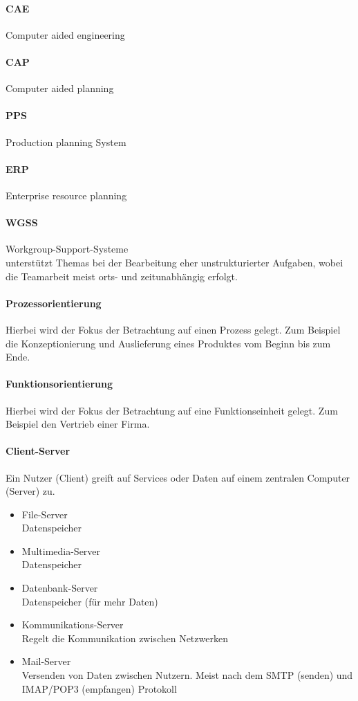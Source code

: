 \documentclass[twocolumn]{article}
\begin{document}
\paragraph{CAE}
	Computer aided engineering

\paragraph{CAP}
	Computer aided planning

\paragraph{PPS}
	Production planning System

\paragraph{ERP}
	Enterprise resource planning

\paragraph{WGSS}
	 Workgroup-Support-Systeme \\
	 unterstützt Themas bei der Bearbeitung eher unstrukturierter Aufgaben, wobei die Teamarbeit meist orts- und zeitunabhängig erfolgt.

\paragraph{Prozessorientierung}
	Hierbei wird der Fokus der Betrachtung auf einen Prozess gelegt. Zum Beispiel die Konzeptionierung und Auslieferung eines Produktes vom Beginn bis zum Ende. 

\paragraph{Funktionsorientierung}
	Hierbei wird der Fokus der Betrachtung auf eine Funktionseinheit gelegt. Zum Beispiel den Vertrieb einer Firma.

\paragraph{Client-Server}
	Ein Nutzer (Client) greift auf Services oder Daten auf einem zentralen Computer (Server) zu. 
	\begin{itemize}
		\item File-Server \\  Datenspeicher
		\item Multimedia-Server \\ Datenspeicher
		\item Datenbank-Server \\ Datenspeicher (für mehr Daten) 
		\item Kommunikations-Server \\ Regelt die Kommunikation zwischen Netzwerken
		\item Mail-Server \\ Versenden von Daten zwischen Nutzern. Meist nach dem SMTP (senden) und IMAP/POP3 (empfangen) Protokoll     
	\end{itemize}
\end{document}
